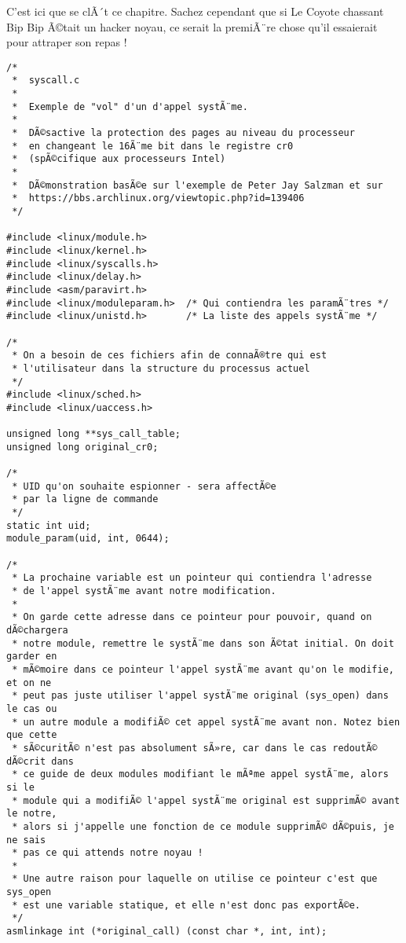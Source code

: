 \documentclass[11pt]{article}
\begin{document}
C'est ici que se clÃ´t ce chapitre. Sachez cependant que si Le Coyote chassant Bip Bip Ã©tait un hacker noyau, ce serait la premiÃ¨re chose qu'il essaierait pour attraper son repas !

\begin{verbatim}
/*
 *  syscall.c
 *
 *  Exemple de "vol" d'un d'appel systÃ¨me.
 *
 *  DÃ©sactive la protection des pages au niveau du processeur
 *  en changeant le 16Ã¨me bit dans le registre cr0
 *  (spÃ©cifique aux processeurs Intel)
 *
 *  DÃ©monstration basÃ©e sur l'exemple de Peter Jay Salzman et sur
 *  https://bbs.archlinux.org/viewtopic.php?id=139406
 */

#include <linux/module.h>
#include <linux/kernel.h>
#include <linux/syscalls.h>
#include <linux/delay.h>
#include <asm/paravirt.h>
#include <linux/moduleparam.h>  /* Qui contiendra les paramÃ¨tres */
#include <linux/unistd.h>       /* La liste des appels systÃ¨me */

/*
 * On a besoin de ces fichiers afin de connaÃ®tre qui est
 * l'utilisateur dans la structure du processus actuel
 */
#include <linux/sched.h>
#include <linux/uaccess.h>

unsigned long **sys_call_table;
unsigned long original_cr0;

/*
 * UID qu'on souhaite espionner - sera affectÃ©e
 * par la ligne de commande
 */
static int uid;
module_param(uid, int, 0644);

/*
 * La prochaine variable est un pointeur qui contiendra l'adresse
 * de l'appel systÃ¨me avant notre modification.
 *
 * On garde cette adresse dans ce pointeur pour pouvoir, quand on dÃ©chargera
 * notre module, remettre le systÃ¨me dans son Ã©tat initial. On doit garder en
 * mÃ©moire dans ce pointeur l'appel systÃ¨me avant qu'on le modifie, et on ne
 * peut pas juste utiliser l'appel systÃ¨me original (sys_open) dans le cas ou
 * un autre module a modifiÃ© cet appel systÃ¨me avant non. Notez bien que cette
 * sÃ©curitÃ© n'est pas absolument sÃ»re, car dans le cas redoutÃ© dÃ©crit dans
 * ce guide de deux modules modifiant le mÃªme appel systÃ¨me, alors si le
 * module qui a modifiÃ© l'appel systÃ¨me original est supprimÃ© avant le notre,
 * alors si j'appelle une fonction de ce module supprimÃ© dÃ©puis, je ne sais
 * pas ce qui attends notre noyau !
 *
 * Une autre raison pour laquelle on utilise ce pointeur c'est que sys_open
 * est une variable statique, et elle n'est donc pas exportÃ©e.
 */
asmlinkage int (*original_call) (const char *, int, int);


\end{verbatim}
\end{document}
